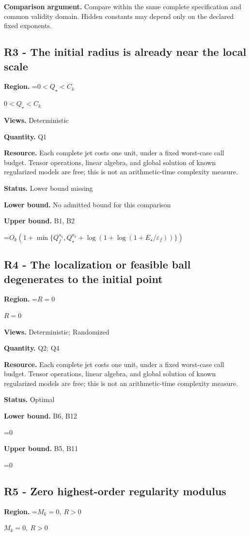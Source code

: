 \documentclass[10pt,a4paper]{article}
\newcommand{\AtlasMath}[1]{\par\begingroup\centering\setbox0=\hbox{$\displaystyle #1$}\ifdim\wd0>1.4\linewidth\typeout{ATLAS WIDE FORMULA: \the\wd0}\fi\ifdim\wd0>\linewidth\resizebox{\linewidth}{!}{\box0}\else\box0\fi\par\endgroup}
\newcommand{\AtlasInlineMath}[1]{\begingroup\setbox0=\hbox{$#1$}\ifdim\wd0>.4\linewidth\endgroup\AtlasMath{#1}\else\endgroup$#1$\fi}
\begin{document}
\textbf{Comparison argument.} Compare within the same complete specification and common validity domain. Hidden constants may depend only on the declared fixed exponents.

\subsection{R3 - The initial radius is already near the local scale}
\textbf{Region.} \AtlasInlineMath{0<Q_\star<C_k}

\textbf{Views.} Deterministic

\textbf{Quantity.} Q1

\textbf{Resource.} Each complete jet costs one unit, under a fixed worst-case call budget. Tensor operations, linear algebra, and global solution of known regularized models are free; this is not an arithmetic-time complexity measure.

\textbf{Status.} Lower bound missing

\textbf{Lower bound.} No admitted bound for this comparison

\textbf{Upper bound.} B1, B2

\AtlasMath{O_k(1+\min\{Q_f^{a_k},Q_\star^{a_k}+\log(1+\log(1+E_\star/\varepsilon_f))\})}
\subsection{R4 - The localization or feasible ball degenerates to the initial point}
\textbf{Region.} \AtlasInlineMath{R=0}

\textbf{Views.} Deterministic; Randomized

\textbf{Quantity.} Q2; Q4

\textbf{Resource.} Each complete jet costs one unit, under a fixed worst-case call budget. Tensor operations, linear algebra, and global solution of known regularized models are free; this is not an arithmetic-time complexity measure.

\textbf{Status.} Optimal

\textbf{Lower bound.} B6, B12

\AtlasMath{0}
\textbf{Upper bound.} B5, B11

\AtlasMath{0}
\subsection{R5 - Zero highest-order regularity modulus}
\textbf{Region.} \AtlasInlineMath{M_k=0,\ R>0}
\end{document}
